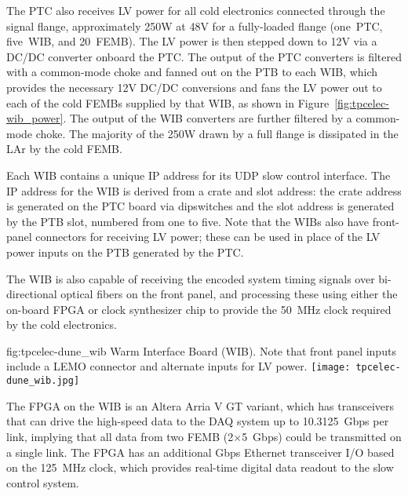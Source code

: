 The PTC also receives LV power for all cold
electronics connected through the signal flange, approximately 250W at 48V for a
fully-loaded flange (one~PTC, five~WIB, and 20~FEMB). The LV power is then stepped down
to 12V via a DC/DC converter onboard the PTC. The output of the PTC converters is filtered with a common-mode choke and fanned out
on the PTB to each WIB, which provides the necessary 12V DC/DC conversions and fans
the LV power out to each of the cold FEMBs supplied by that WIB, 
as shown in Figure~\ref{fig:tpcelec-wib_power}. The output of the WIB converters are further filtered by a common-mode choke. The 
majority of the 250W drawn by a full flange is dissipated in the LAr
by the cold FEMB.

Each WIB contains a 
unique IP address for its UDP slow control interface. The IP address for the WIB is 
derived from a crate and slot address: the crate address is generated on the PTC 
board via dipswitches and the slot address is generated by the PTB slot, numbered 
from one to five. Note that the WIBs also have front-panel
connectors for receiving LV power; these can be used in place of 
the LV power inputs on the PTB generated by the PTC.

The WIB is also capable of
receiving the encoded system timing signals over bi-directional optical
fibers on the front panel, and processing these using either
the on-board FPGA or clock synthesizer chip to provide the 50~MHz
clock required by the cold electronics.  

\begin{dunefigure}
{fig:tpcelec-dune_wib}
{Warm Interface Board (WIB). Note that front panel inputs include a LEMO connector and alternate inputs for LV power.}
\texttt{[image: tpcelec-dune\_wib.jpg]}
\end{dunefigure}

The FPGA on the WIB is an Altera Arria V GT variant, which has
transceivers that can drive the high-speed data to the DAQ system up to
10.3125~Gbps per link, implying that all data from
two FEMB (2$\times$5~Gbps) could be transmitted on a single link.
The FPGA has an additional Gbps Ethernet transceiver I/O based on the 125~MHz clock, which 
provides real-time digital data readout to the slow control system.
